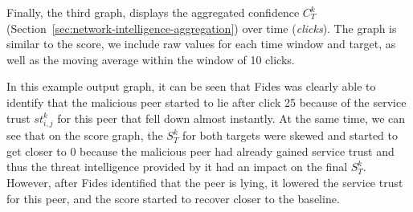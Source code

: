 Finally, the third graph, displays the aggregated confidence $C^{k}_{T}$ (Section~\ref{sec:network-intelligence-aggregation}) over time (\textit{clicks}).
The graph is similar to the score, we include raw values for each time window and target, as well as the moving average within the window of 10 clicks.

In this example output graph, it can be seen that Fides was clearly able to identify that the malicious peer started to lie after click 25 because of the service trust $st^{k}_{i,j}$ for this peer that fell down almost instantly.
At the same time, we can see that on the score graph, the $S^{k}_{T}$ for both targets were skewed and started to get closer to $0$ because the malicious peer had already gained service trust and thus the threat intelligence provided by it had an impact on the final $S^{k}_{T}$.
However, after Fides identified that the peer is lying, it lowered the service trust for this peer, and the score started to recover closer to the baseline.